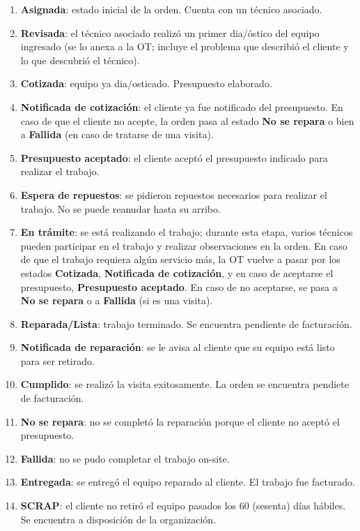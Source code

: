 \documentclass[12pt]{extarticle}
\begin{document}
\begin{spacing}{1.2}
    \begin{enumerate}
        \item \textbf{Asignada}: estado inicial de la orden. Cuenta con un técnico asociado.
        \item \textbf{Revisada}: el técnico asociado realizó un primer dia/óstico del equipo ingresado (se lo anexa a la OT; incluye el problema que describió el cliente y lo que descubrió el técnico).
        \item \textbf{Cotizada}: equipo ya dia/osticado. Presupuesto elaborado.
        \item \textbf{Notificada de cotización}: el cliente ya fue notificado del presupuesto. En caso de que el cliente no acepte, la orden pasa al estado \textbf{No se repara} o bien a \textbf{Fallida} (en caso de tratarse de una visita). 
        \item \textbf{Presupuesto aceptado}: el cliente aceptó el presupuesto indicado para realizar el trabajo.
        \item \textbf{Espera de repuestos}: se pidieron repuestos necesarios para realizar el trabajo. No se puede reanudar hasta su arribo.
        \item \textbf{En trámite}: se está realizando el trabajo; durante esta etapa, varios técnicos pueden participar en el trabajo y realizar observaciones en la orden. En caso de que el trabajo requiera algún servicio más, la OT vuelve a pasar por los estados \textbf{Cotizada}, \textbf{Notificada de cotización}, y en caso de aceptarse el presupuesto, \textbf{Presupuesto aceptado}. En caso de no aceptarse, se pasa a \textbf{No se repara} o a \textbf{Fallida} (si es una visita).
        \item \textbf{Reparada/Lista}: trabajo terminado. Se encuentra pendiente de facturación.
        \item \textbf{Notificada de reparación}: se le avisa al cliente que su equipo está listo para ser retirado.
        \item \textbf{Cumplido}: se realizó la visita exitosamente. La orden se encuentra pendiete de facturación.
        \item \textbf{No se repara}: no se completó la reparación porque el cliente no aceptó el presupuesto.
        \item \textbf{Fallida}: no se pudo completar el trabajo on-site.
        \item \textbf{Entregada}: se entregó el equipo reparado al cliente. El trabajo fue facturado.
        \item \textbf{SCRAP}: el cliente no retiró el equipo pasados los 60 (sesenta) días hábiles. Se encuentra a disposición de la organización.
    \end{enumerate}


\end{spacing}
\end{document}
